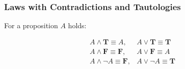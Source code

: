 \documentclass{beamer}
\theoremstyle{remark}
\begin{document}
\begin{frame}
 \frametitle{Laws with Contradictions and Tautologies}
 
\begin{theorem}
 	For a proposition $A$ holds:
	
\begin{eqnarray*}
 A \land \mathbf{T}  \equiv A, &  A \lor \mathbf{T} \equiv \mathbf{T} \\
 A \land \mathbf{F}  \equiv \mathbf{F}, &  A \lor \mathbf{F} \equiv A \\
 A \land \lnot A \equiv \mathbf{F}, & A \lor \lnot A \equiv \mathbf{T}
\end{eqnarray*}
\end{theorem}
\end{frame}
\end{document}
